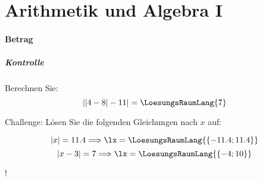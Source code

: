 \part{Arithmetik und Algebra I}
\renewcommand{\bbwPartID}{AA1}

\newpage




\subsection{Betrag}

\subsubsection{Kontrolle}
Berechnen Sie:
$$\left| |4-8| - 11 \right| = \LoesungsRaumLang{7}$$

Challenge: Lösen Sie die folgenden Gleichungen nach $x$ auf:

$$|x| = 11.4 \Longrightarrow \lx = \LoesungsRaumLang{\{-11.4; 11.4\}}$$
$$|x-3| = 7 \Longrightarrow \lx = \LoesungsRaumLang{\{-4; 10\}}$$

!
\newpage
%







\newpage
